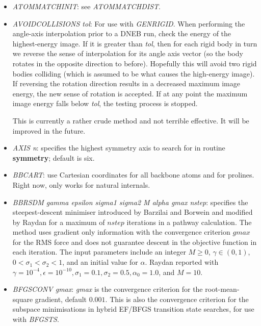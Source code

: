 \documentclass[12pt,a4paper,dvips]{article}
\begin{document}
\begin{itemize}
\item {\it ATOMMATCHINIT}: see {\it ATOMMATCHDIST}.

\item {\it AVOIDCOLLISIONS tol}: For use with {\it GENRIGID}. When performing the angle-axis interpolation prior to a DNEB run, 
check the energy of the highest-energy image. If it is greater than {\it tol}, then for each rigid body in turn we reverse the sense of interpolation for its angle axis vector (so the body rotates in the opposite direction to before). Hopefully this will avoid two rigid bodies colliding (which is assumed to be what causes the high-energy image). If reversing the rotation direction results in a decreased maximum image energy, the new sense of rotation is accepted. If at any point the maximum image energy falls below {\it tol}, the testing process is stopped.

This is currently a rather crude method and not terrible effective. It will be improved in the future.

\item {\it AXIS n}: specifies the highest symmetry axis to search for in
routine {\bf symmetry}; default is six.

\item {\it BBCART\/}: use Cartesian coordinates for all backbone atoms and for
  prolines. Right now, only works for natural internals.

\item {\it BBRSDM gamma epsilon sigma1 sigma2 M alpha gmax nstep}: specifies
the steepest-descent minimiser introduced by Barzilai and Borwein \cite{BB-IMAJNA-1988}
and modified by Raydan \cite{Raydan-SIAMJO-1997} for a maximum of $nstep$ iterations
in a pathway calculation. The method uses 
gradient only information with the convergence criterion $gmax$ for the RMS force
and does not guarantee descent in the objective function in each iteration.
The input parameters include an integer $M \ge 0$, $\gamma \in (0,1)$, 
$0 < \sigma_{1} < \sigma_{2} < 1$, and an initial value for $\alpha$. Raydan reported
with $\gamma = 10^{-4}, \epsilon = 10^{-10},
\sigma_{1} = 0.1, \sigma_{2} = 0.5, \alpha_{0} = 1.0$, and $M = 10$.   

\item {\it BFGSCONV gmax\/}: 
{\it gmax\/} is the convergence criterion
for the root-mean-square gradient, default $0.001$.
This is also the convergence criterion
for the subspace minimisations in hybrid EF/BFGS transition state searches, for use with {\it BFGSTS\/}.


\end{itemize}
\end{document}
